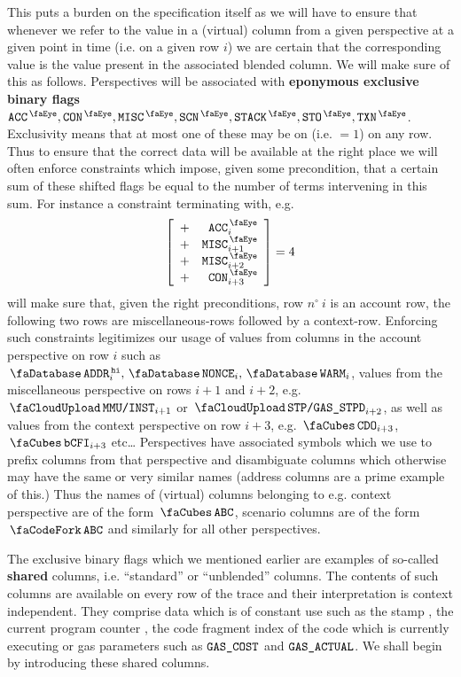 This puts a burden on the specification itself as we will have to ensure that whenever we refer to the value in a (virtual) column from a given perspective at a given point in time (i.e. on a given row $i$) we are certain that the corresponding value is the value present in the associated blended column.
We will make sure of this as follows.
Perspectives will be associated with \textbf{eponymous exclusive binary flags} $\peekAccount, \peekContext, \peekMisc, \peekScenario, \peekStack, \peekStorage, \peekTransaction$.
Exclusivity means that at most one of these may be on (i.e. $=1$) on any row.
Thus to ensure that the correct data will be available at the right place we will often enforce constraints which impose, given some precondition, that a certain sum of these shifted flags be equal to the number of terms intervening in this sum. For instance a constraint terminating with, e.g.
\[
	\left[ \begin{array}{cr}
		+ & \peekAccount_{i} \\
		+ & \peekMisc   _{i + 1} \\
		+ & \peekMisc   _{i + 2} \\
		+ & \peekContext_{i + 3} \\
	\end{array} \right]
	=
	4
\]
will make sure that, given the right preconditions, row $n^\circ~i$ is an account row, the following two rows are miscellaneous-rows followed by a context-row.
Enforcing such constraints legitimizes our usage of values from columns in the account perspective on row $i$ such as $\accAddressHi_{i}, \accNonce_{i}, \accWarmth_{i}$,
values from the miscellaneous perspective on rows $i + 1$ and $i + 2$, e.g. $\miscMmuInst_{i + 1}$ or $\miscStpGasStipend_{i + 2}$,
as well as values from the context perspective on row $i + 3$, e.g. $\cnCdo_{i + 3}$, $\cnCodeCfi_{i + 3}$ etc\dots{}
\saNote{} Perspectives have associated symbols which we use to prefix columns from that perspective and disambiguate columns which otherwise may have the same or very similar names (address columns are a prime example of this.)
Thus the names of (virtual) columns belonging to e.g.
context perspective are of the form $\contextSignifier\col{ABC}$,
scenario columns are of the form $\scenarioSignifier\col{ABC}$ and similarly for all other perspectives.

The exclusive binary flags which we mentioned earlier are examples of so-called \textbf{shared} columns, i.e. ``standard'' or ``unblended'' columns.
The contents of such columns are available on every row of the trace and their interpretation is context independent.
They comprise data which is of constant use such as the \hubMod{} stamp \hubStamp{}, the current program counter \pc{}, the code fragment index \cfi{} of the code which is currently executing or gas parameters such as $\texttt{GAS}\texttt{\_COST}$ and $\texttt{GAS}\texttt{\_ACTUAL}$.
We shall begin by introducing these shared columns.


